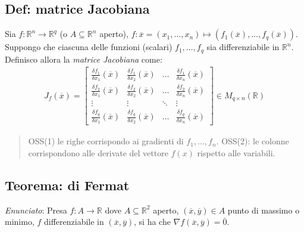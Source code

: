 \documentclass{article}
\begin{document}
\subsection{Def: matrice Jacobiana}

Sia $f: \mathbb{R}^n \to \mathbb{R}^q$ (o $A \subseteq \mathbb{R}^n$ aperto),
$f: \overline{x} = (x_1, \ldots, x_n) \mapsto (f_1(\overline{x}), \ldots, f_q(\overline{x}))$.
Suppongo che ciascuna delle funzioni (scalari) $f_1, \ldots, f_q$ sia differenziabile in $\mathbb{R}^n$.
Definisco allora la \emph{matrice Jacobiana} come:
\begin{align*}
  J_f(\overline{x}) =
  \begin{bmatrix}
    \frac{\delta f_1}{\delta x_1}(\overline{x}) &
    \frac{\delta f_1}{\delta x_2}(\overline{x}) & \ldots &
    \frac{\delta f_1}{\delta x_n}(\overline{x}) \\
    \frac{\delta f_2}{\delta x_1}(\overline{x}) &
    \frac{\delta f_2}{\delta x_2}(\overline{x}) & \ldots &
    \frac{\delta f_2}{\delta x_n}(\overline{x}) \\
    \vdots & \vdots & \ddots & \vdots \\
    \frac{\delta f_q}{\delta x_1}(\overline{x}) &
    \frac{\delta f_q}{\delta x_2}(\overline{x}) & \ldots &
    \frac{\delta f_q}{\delta x_n}(\overline{x})
  \end{bmatrix} \in M_{q \times n} (\mathbb{R})
\end{align*}

\begin{quote}
  OSS(1) le righe corrispondo ai gradienti di $f_1, \ldots, f_n$.
  OSS(2): le colonne corrispondono alle derivate del vettore $f(x)$ rispetto alle variabili.
\end{quote}

\subsection{Teorema: di Fermat}

\emph{Enunciato}: Presa $f: A \to \mathbb{R}$ dove $A \subseteq \mathbb{R}^2$
aperto, $(\overline{x}, \overline{y}) \in A$ punto di massimo o minimo, $f$
differenziabile in $(\overline{x}, \overline{y})$, si ha che $\nabla
f(\overline{x}, \overline{y}) = \overline{0}$. \\
\end{document}
